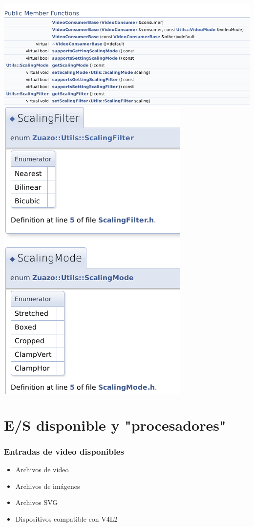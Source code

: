 \documentclass{beamer}
\begin{document}
\begin{frame}[allowframebreaks]
\begin{center}
	\includegraphics[width=\textwidth]{video_consumer} 
	\includegraphics[height=0.8\textheight]{scaling} 
\end{center}
\end{frame}

%
%
\section{E/S disponible y "procesadores"}

\begin{frame}[t] \frametitle{Entradas de video disponibles}
	\begin{itemize}
		\item{Archivos de video} \pause
		\item{Archivos de imágenes} \pause
		\item{Archivos SVG} \pause
		\item{Dispositivos compatible con V4L2}
	\end{itemize}
\end{frame}
\end{document}
